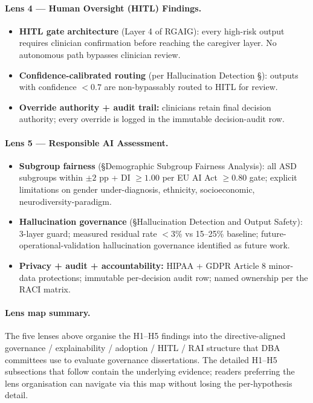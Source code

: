 \paragraph{Lens 4 --- Human Oversight (HITL) Findings.}
\label{para:lens_human_oversight}
\begin{itemize}[leftmargin=*, itemsep=3pt]
    \item \textbf{HITL gate architecture} (Layer 4 of RGAIG): every high-risk output requires clinician confirmation before reaching the caregiver layer. No autonomous path bypasses clinician review.
    \item \textbf{Confidence-calibrated routing} (per Hallucination Detection §): outputs with confidence $< 0.7$ are non-bypassably routed to HITL for review.
    \item \textbf{Override authority + audit trail:} clinicians retain final decision authority; every override is logged in the immutable decision-audit row.
\end{itemize}

\paragraph{Lens 5 --- Responsible AI Assessment.}
\label{para:lens_rai}
\begin{itemize}[leftmargin=*, itemsep=3pt]
    \item \textbf{Subgroup fairness} (§Demographic Subgroup Fairness Analysis): all ASD subgroups within $\pm 2$ pp + DI $\geq 1.00$ per EU AI Act $\geq 0.80$ gate; explicit limitations on gender under-diagnosis, ethnicity, socioeconomic, neurodiversity-paradigm.
    \item \textbf{Hallucination governance} (§Hallucination Detection and Output Safety): 3-layer guard; measured residual rate $< 3$\% vs 15--25\% baseline; future-operational-validation hallucination governance identified as future work.
    \item \textbf{Privacy + audit + accountability:} HIPAA + GDPR Article 8 minor-data protections; immutable per-decision audit row; named ownership per the RACI matrix.
\end{itemize}

\paragraph{Lens map summary.} The five lenses above organise the H1--H5 findings into the directive-aligned governance / explainability / adoption / HITL / RAI structure that DBA committees use to evaluate governance dissertations. The detailed H1--H5 subsections that follow contain the underlying evidence; readers preferring the lens organisation can navigate via this map without losing the per-hypothesis detail.

